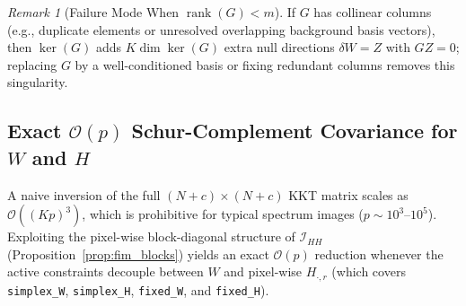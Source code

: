 \documentclass[11pt,a4paper]{article}
\theoremstyle{plain}
\theoremstyle{definition}
\theoremstyle{remark}
\newtheorem{remark}[theorem]{Remark}
\newcommand{\cI}{\mathcal{I}}
\newcommand{\rank}{\operatorname{rank}}
\begin{document}
\begin{remark}[Failure Mode When $\rank(G) < m$]
If $G$ has collinear columns (e.g., duplicate elements or unresolved overlapping background basis vectors), then $\ker(G)$ adds $K \dim\ker(G)$ extra null directions $\delta W = Z$ with $GZ=0$; replacing $G$ by a well-conditioned basis or fixing redundant columns removes this singularity.
\end{remark}

\subsection{Exact \texorpdfstring{$\mathcal{O}(p)$}{O(p)} Schur-Complement Covariance for \texorpdfstring{$W$}{W} and \texorpdfstring{$H$}{H}}
A naive inversion of the full $(N+c) \times (N+c)$ KKT matrix scales as $\mathcal{O}((Kp)^3)$, which is prohibitive for typical spectrum images ($p \sim 10^3\text{--}10^5$). Exploiting the pixel-wise block-diagonal structure of $\cI_{HH}$ (Proposition~\ref{prop:fim_blocks}) yields an exact $\mathcal{O}(p)$ reduction whenever the active constraints decouple between $W$ and pixel-wise $H_{\cdot, r}$ (which covers \texttt{simplex\_W}, \texttt{simplex\_H}, \texttt{fixed\_W}, and \texttt{fixed\_H}).
\end{document}
